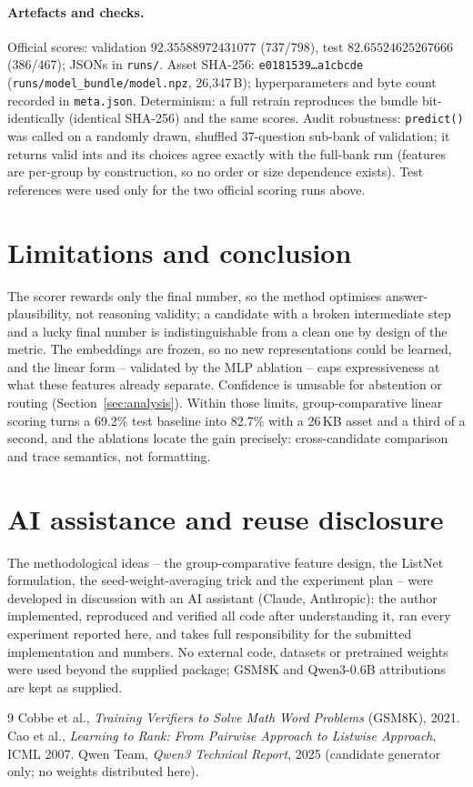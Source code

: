 \documentclass[10pt,a4paper]{article}
\begin{document}
\paragraph{Artefacts and checks.}
Official scores: validation $92.35588972431077$ (737/798), test
$82.65524625267666$ (386/467); JSONs in \texttt{runs/}. Asset SHA-256:
\texttt{e0181539\ldots a1cbcde} (\texttt{runs/model\_bundle/model.npz},
26{,}347\,B); hyperparameters and byte count recorded in
\texttt{meta.json}. Determinism: a full retrain reproduces the bundle
bit-identically (identical SHA-256) and the same scores. Audit robustness:
\texttt{predict()} was called on a randomly drawn, shuffled 37-question
sub-bank of validation; it returns valid ints and its choices agree exactly
with the full-bank run (features are per-group by construction, so no
order or size dependence exists). Test references were used only for the two
official scoring runs above.

\section{Limitations and conclusion}
The scorer rewards only the final number, so the method optimises
answer-plausibility, not reasoning validity; a candidate with a broken
intermediate step and a lucky final number is indistinguishable from a clean
one by design of the metric. The embeddings are frozen, so no new
representations could be learned, and the linear form -- validated by the MLP
ablation -- caps expressiveness at what these features already separate.
Confidence is unusable for abstention or routing (Section~\ref{sec:analysis}).
Within those limits, group-comparative linear scoring turns a 69.2\% test
baseline into 82.7\% with a 26\,KB asset and a third of a second, and the
ablations locate the gain precisely: cross-candidate comparison and trace
semantics, not formatting.

\section*{AI assistance and reuse disclosure}
The methodological ideas -- the group-comparative feature design, the ListNet
formulation, the seed-weight-averaging trick and the experiment plan -- were
developed in discussion with an AI assistant (Claude, Anthropic); the author
implemented, reproduced and verified all code after understanding it, ran every
experiment reported here, and takes full responsibility for the submitted
implementation and numbers. No external code, datasets or pretrained weights
were used beyond the supplied package; GSM8K and Qwen3-0.6B attributions are
kept as supplied.

\begin{thebibliography}{9}\small
{} Cobbe et al., \emph{Training Verifiers to Solve Math Word
Problems} (GSM8K), 2021.
 Cao et al., \emph{Learning to Rank: From Pairwise Approach
to Listwise Approach}, ICML 2007.
 Qwen Team, \emph{Qwen3 Technical Report}, 2025 (candidate
generator only; no weights distributed here).
\end{thebibliography}
\end{document}
